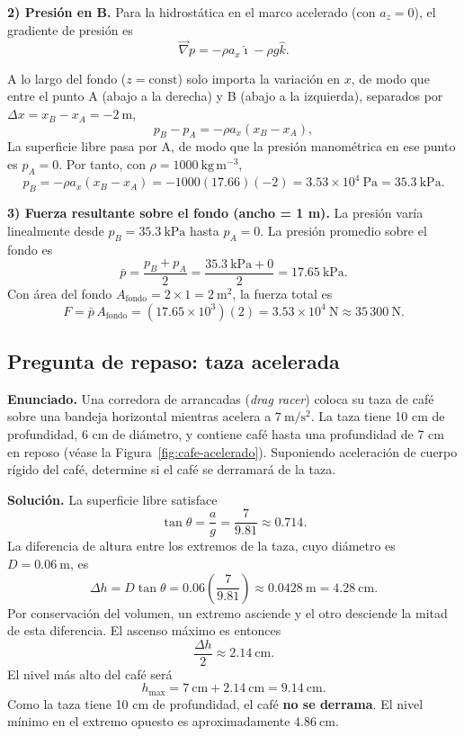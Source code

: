 \textbf{2) Presión en B.} Para la hidrostática en el marco acelerado (con $a_z = 0$), el gradiente de presión es
$$ \vec{\nabla}p = -\rho a_x\hat{\imath} - \rho g\hat{k}. $$

A lo largo del fondo ($z = \mathrm{const}$) solo importa la variación en $x$, de modo que entre el punto A (abajo a la derecha) y B (abajo a la izquierda), separados por $\Delta x = x_B - x_A = -2\ \mathrm{m}$,
$$ p_B - p_A = -\rho a_x(x_B - x_A), $$
La superficie libre pasa por A, de modo que la presión manométrica en ese punto es $p_A=0$. Por tanto, con $\rho = 1000\ \mathrm{kg\,m^{-3}}$,
$$ p_B = -\rho a_x(x_B - x_A) = -1000(17.66)(-2) = 3.53\times 10^4\ \mathrm{Pa} = 35.3\ \mathrm{kPa}. $$

\textbf{3) Fuerza resultante sobre el fondo (ancho = 1 m).} La presión varía linealmente desde $p_B = 35.3\ \mathrm{kPa}$ hasta $p_A = 0$. La presión promedio sobre el fondo es
$$ \bar{p} = \frac{p_B + p_A}{2} = \frac{35.3\ \mathrm{kPa} + 0}{2} = 17.65\ \mathrm{kPa}. $$
Con área del fondo $A_{\mathrm{fondo}} = 2 \times 1 = 2\ \mathrm{m}^2$, la fuerza total es
$$ F = \bar{p}\,A_{\mathrm{fondo}} = (17.65\times 10^3)(2) = 3.53\times 10^4\ \mathrm{N} \approx 35\,300\ \mathrm{N}. $$

\subsection{Pregunta de repaso: taza acelerada}

\textbf{Enunciado.} Una corredora de arrancadas (\emph{drag racer}) coloca su taza de café sobre una bandeja horizontal mientras acelera a $7\ \mathrm{m/s^2}$. La taza tiene 10 cm de profundidad, 6 cm de diámetro, y contiene café hasta una profundidad de 7 cm en reposo (véase la Figura~\ref{fig:cafe-acelerado}). Suponiendo aceleración de cuerpo rígido del café, determine si el café se derramará de la taza.

\figuraCafeAcelerado

\textbf{Solución.} La superficie libre satisface
$$ \tan\theta = \frac{a}{g} = \frac{7}{9.81} \approx 0.714. $$
La diferencia de altura entre los extremos de la taza, cuyo diámetro es $D=0.06\ \mathrm{m}$, es
$$ \Delta h = D\tan\theta = 0.06\left(\frac{7}{9.81}\right) \approx 0.0428\ \mathrm{m} = 4.28\ \mathrm{cm}. $$
Por conservación del volumen, un extremo asciende y el otro desciende la mitad de esta diferencia. El ascenso máximo es entonces
$$ \frac{\Delta h}{2} \approx 2.14\ \mathrm{cm}. $$
El nivel más alto del café será
$$ h_{\max}=7\ \mathrm{cm}+2.14\ \mathrm{cm}=9.14\ \mathrm{cm}. $$
Como la taza tiene 10 cm de profundidad, el café \textbf{no se derrama}. El nivel mínimo en el extremo opuesto es aproximadamente $4.86\ \mathrm{cm}$.

